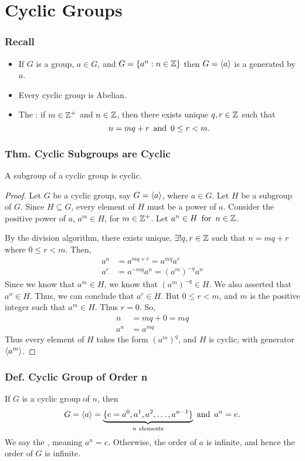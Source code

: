 \section{Cyclic Groups}

\subsubsection*{Recall}
\begin{itemize}
    \item If $G$ is a group, $a \in G$, and $G = \{a^n : n \in \mathbb{Z}\}$ then $G = \langle a \rangle$ is a  generated by $a$.
    \item Every cyclic group is Abelian.
    \item The : if $m \in \mathbb{Z}^+$ and $n \in \mathbb{Z}$, then there exists unique $q,r \in \mathbb{Z}$ such that
    \[
        n = mq + r \operatorname{~\text{and}~} 0 \leq r < m.
    \]
\end{itemize}

\subsubsection{Thm. Cyclic Subgroups are Cyclic}
A subgroup of a cyclic group is cyclic.
\begin{proof}
    Let $G$ be a cyclic group, say $G = \langle a \rangle$, where $a \in G$. Let $H$ be a subgroup of $G$. Since $H \subseteq G$, every element of $H$ must be a power of $a$. Consider the  positive power of $a$, $a^m \in H$, for $m \in \mathbb{Z}^+$. Let $a^n \in H \operatorname{~\text{for}~} n \in \mathbb{Z}$.

    By the division algorithm, there exists unique, $\exists! q,r \in \mathbb{Z}$ such that $n = mq+r$ where $0 \leq r < m$. Then,
    \begin{align*}
        a^n & = a^{mq+r} = a^{mq}a^r \\
        a^r & = a^{-mq}a^n = (a^m)^{-q}a^n
    \end{align*}
    Since we know that $a^m \in H$, we know that $(a^m)^{-q} \in H$. We also asserted that $a^n \in H$. Thus, we can conclude that $a^r \in H$. But $0 \leq r < m$, and $m$ is the  positive integer such that $a^m \in H$. Thus $r = 0$. So,
    \begin{align*}
        n & = mq + 0 = mq \\
        a^n & = a^{mq}
    \end{align*}
    Thus every element of $H$ takes the form $(a^m)^q$, and $H$ is cyclic, with generator $\langle a^m \rangle$.
\end{proof}

\subsubsection*{Def. Cyclic Group of Order n}
If $G$ is a cyclic group of  $n$, then
\[
    G = \langle a \rangle = \underbrace{\{e = a^0, a^1, a^2, \ldots, a^{n-1}\}}_{n~\text{elements}} \operatorname{~\text{and}~} a^n = e.
\]
We say the , meaning $a^n = e$. Otherwise, the order of $a$ is infinite, and hence the order of $G$ is infinite.
